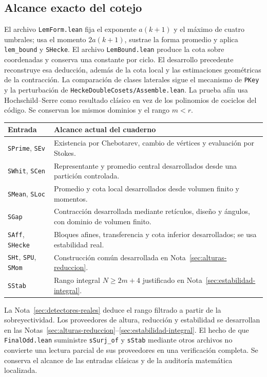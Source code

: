 \subsection{Alcance exacto del cotejo}

El archivo \texttt{LemForm.lean} fija el exponente $a(k+1)$ y el máximo de cuatro umbrales; usa el momento $2a(k+1)$, sustrae la forma promedio y aplica \texttt{lem\_bound} y \texttt{SHecke}. El archivo \texttt{LemBound.lean} produce la cota sobre coordenadas y conserva una constante por ciclo. El desarrollo precedente reconstruye esa deducción, además de la cota local y las estimaciones geométricas de la contracción. La comparación de clases laterales sigue el mecanismo de \texttt{PKey} y la perturbación de \texttt{HeckeDoubleCosets/Assemble.lean}. La prueba afín usa Hochschild--Serre como resultado clásico en vez de los polinomios de cociclos del código. Se conservan los mismos dominios y el rango $m<r$.

\begin{center}\small
\begin{tabularx}{\textwidth}{@{}p{}Y@{}}
\toprule
Entrada & Alcance actual del cuaderno\\\midrule
\texttt{SPrime}, \texttt{SEv} & Existencia por Chebotarev, cambio de vértices y evaluación por Stokes.\\
\texttt{SWhit}, \texttt{SCen} & Representante y promedio central desarrollados desde una partición controlada.\\
\texttt{SMean}, \texttt{SLoc} & Promedio y cota local desarrollados desde volumen finito y momentos.\\
\texttt{SGap} & Contracción desarrollada mediante retículos, diseño y ángulos, con dominio de volumen finito.\\
\texttt{SAff}, \texttt{SHecke} & Bloques afines, transferencia y cota inferior desarrollados; se usa estabilidad real.\\
\texttt{SHt}, \texttt{SPU}, \texttt{SMom} & Construcción común desarrollada en Nota~\ref{sec:alturas-reduccion}.\\
\texttt{SStab} & Rango integral $N\ge2m+4$ justificado en Nota~\ref{sec:estabilidad-integral}.\\\bottomrule
\end{tabularx}
\end{center}

La Nota~\ref{sec:detectores-reales} deduce el rango filtrado a partir de la sobreyectividad. Los proveedores de altura, reducción y estabilidad se desarrollan en las Notas~\ref{sec:alturas-reduccion}--\ref{sec:estabilidad-integral}. El hecho de que \texttt{FinalOdd.lean} suministre \texttt{sSurj\_of} y \texttt{sStab} mediante otros archivos no convierte una lectura parcial de sus proveedores en una verificación completa. Se conserva el alcance de las entradas clásicas y de la auditoría matemática localizada.

